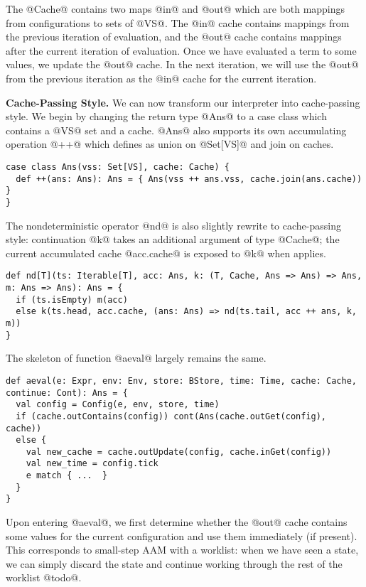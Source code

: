 \documentclass[acmsmall]{acmart}\settopmatter{}
\begin{document}
The @Cache@ contains two maps @in@ and @out@ which are both mappings from configurations 
to sets of @VS@. The @in@ cache contains mappings from the previous iteration of evaluation, 
and the @out@ cache contains mappings after the current iteration of evaluation. 
Once we have evaluated a term to some values, we update the @out@ cache. In the next 
iteration, we will use the @out@ from the previous iteration as the @in@ cache for the 
current iteration.

\textbf{Cache-Passing Style.}
We can now transform our interpreter into cache-passing style. We begin by changing the 
return type @Ans@ to a case class which contains a @VS@ set and a cache. @Ans@ also supports
its own accumulating operation @++@ which defines as union on @Set[VS]@ and join on caches.

\begin{lstlisting}
case class Ans(vss: Set[VS], cache: Cache) {
  def ++(ans: Ans): Ans = { Ans(vss ++ ans.vss, cache.join(ans.cache)) }
}
\end{lstlisting}

The nondeterministic operator @nd@ is also slightly rewrite to cache-passing style:
continuation @k@ takes an additional argument of type @Cache@; the current accumulated
cache @acc.cache@ is exposed to @k@ when applies.

\begin{lstlisting}
def nd[T](ts: Iterable[T], acc: Ans, k: (T, Cache, Ans => Ans) => Ans, m: Ans => Ans): Ans = {
  if (ts.isEmpty) m(acc)
  else k(ts.head, acc.cache, (ans: Ans) => nd(ts.tail, acc ++ ans, k, m))
}
\end{lstlisting}

The skeleton of function @aeval@ largely remains the same. 

\begin{lstlisting}
def aeval(e: Expr, env: Env, store: BStore, time: Time, cache: Cache, continue: Cont): Ans = {
  val config = Config(e, env, store, time)
  if (cache.outContains(config)) cont(Ans(cache.outGet(config), cache))
  else {
    val new_cache = cache.outUpdate(config, cache.inGet(config))
    val new_time = config.tick 
    e match { ...  }
  }
}
\end{lstlisting}

Upon entering @aeval@, we first determine whether the @out@ cache
contains some values for the current configuration and use them immediately (if present).
This corresponds to small-step AAM with a worklist: when we have seen a state,
we can simply discard the state and continue working through the rest of the worklist @todo@.
\end{document}
